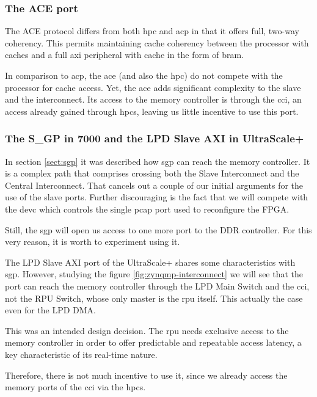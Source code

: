 \subsubsection{The ACE port}

The ACE protocol differs from both \gls{hpc} and \gls{acp} 
in that it offers full, two-way coherency. This permits
maintaining cache coherency between the processor with caches and a
full \gls{axi} peripheral with cache in the form of \gls{bram}.

In comparison to \gls{acp}, the \gls{ace} (and also the \gls{hpc}) do not compete
with the processor for cache access. 
Yet, the \gls{ace} adds significant complexity to the slave and the interconnect.
Its access to the memory controller is through the \gls{cci}, an access already
gained through \glspl{hpc}, leaving us little incentive to use this port.

\subsubsection{The S\_GP in 7000 and the LPD Slave AXI in UltraScale+}

In section \ref{sect:sgp} it was described how \gls{sgp} can reach the memory controller.
It is a complex path that comprises crossing both the Slave Interconnect and the Central
Interconnect. That cancels out a couple of our initial arguments for the use of the slave ports.
Further discouraging is the fact that we will compete 
with the \gls{devc} which controls the single \gls{pcap}
port used to reconfigure the FPGA.

Still, the \gls{sgp} will open us access to one more port to the DDR controller.
For this very reason, it is worth to experiment using it.

The LPD Slave AXI port of the UltraScale+ shares some characteristics with \gls{sgp}.
However, studying the figure \ref{fig:zynqmp-interconnect} we will see that the port
can reach the memory controller through the LPD Main Switch and the \gls{cci},
not the RPU Switch, whose only master is the \gls{rpu} itself.
This actually the case even for the LPD DMA.

This was an intended design decision. The \gls{rpu} needs exclusive access to the
memory controller in order to offer predictable and repeatable access latency,
a key characteristic of its real-time nature.

Therefore, there is not much incentive to use it, since we already access the
memory ports of the \gls{cci} via the \glspl{hpc}.

